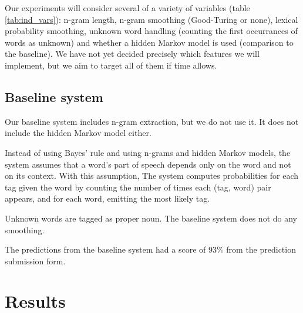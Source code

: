 \documentclass{article}
\begin{document}
Our experiments will consider several of a variety of variables (table \ref{tab:ind_vars}): n-gram length,
n-gram smoothing (Good-Turing or none), lexical probability smoothing, unknown
word handling (counting the first occurrances of words as unknown) and
whether a hidden Markov model is used (comparison to the baseline).
We have not yet decided precisely which features we will implement, but we
aim to target all of them if time allows.

\subsection{Baseline system}
Our baseline system includes n-gram extraction,
but we do not use it.
It does not include the hidden Markov model either.

Instead of using Bayes' rule and using n-grams and hidden Markov models,
the system assumes that a word's part of speech depends only
on the word and not on its context. With this assumption,
The system computes probabilities for each tag given the word by counting the
number of times each (tag, word) pair appears, and for each word, emitting the
most likely tag.

Unknown words are tagged as proper noun.
The baseline system does not do any smoothing.

The predictions from the baseline system had a score of 93\%
from the prediction submission form.

\section{Results}

\end{document}
